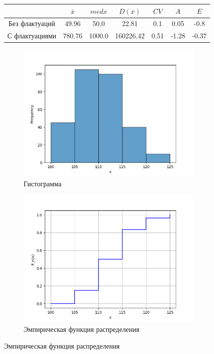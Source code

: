 \documentclass[12pt,a4paper]{article}
\begin{document}
\begin{figure}
		\begin{subtable}[htbp!]{0.8\textwidth}
			\centering
			\begin{tabular}{ |c|c|c|c|c|c|c| }
				\hline
				& \( \bar x \) & \( med x \) & \( D(x) \) & \( CV \) & \( A \) & \( E \) \\
				\hline
				Без флактуаций & 49.96 & 50.0 & 22.81 & 0.1 & 0.05 & -0.8 \\
				\hline
				С флактуациями & 780.76 & 1000.0 & 160226.42 & 0.51 & -1.28 & -0.37 \\
				\hline
			\end{tabular}
		\end{subtable}
	\end{figure}

	\begin{figure}
		\begin{subfigure}[htbp!]{0.8\textwidth}
			\begin{center}
				\includegraphics[width = 0.8\linewidth]{../graphics/3_hist.png}
				\caption{Гистограмма}
			\end{center}
		\end{subfigure}

		\begin{subfigure}[htbp!]{0.8\textwidth}
			\begin{center}
				\includegraphics[width = 0.8\linewidth]{../graphics/3_cdf.png}
				\caption{Эмпирическая функция распределения}
			\end{center}
		\end{subfigure}


\end{figure}
\end{document}
